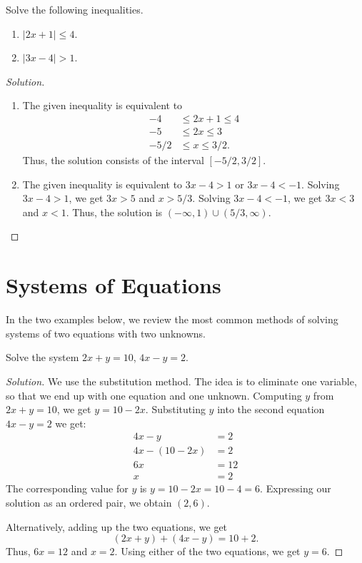 \documentclass{ximera}
\begin{document}
\begin{example}
Solve the following inequalities.
\begin{enumerate}
	\item $|2x+1| \leq 4$.
	\item $|3x-4| > 1$.
\end{enumerate}
\end{example}
\begin{proof}[Solution]
\begin{enumerate}
	\item{The given inequality is equivalent to
		\begin{align*}
			-4 &\leq 2x+1 \leq 4\\
			-5 &\leq 2x \leq 3\\
			-5/2 &\leq x \leq 3/2.
		\end{align*}
		Thus, the solution consists of the interval $[-5/2, 3/2]$.
	}
	\item{
		The given inequality is equivalent to $3x-4>1$ or $3x-4 < -1$.  Solving $3x-4 > 1$, we get $3x>5$ and $x > 5/3$.  Solving $3x-4 < -1$, we get $3x < 3$ and $x < 1$.
		Thus, the solution is $(-\infty, 1) \cup (5/3, \infty)$.
	}
\end{enumerate}
\end{proof}

\section{Systems of Equations}
In the two examples below, we review the most common methods of solving systems of two equations with two unknowns.

\begin{example}
	Solve the system $2x+y = 10$, $4x-y = 2$.
\end{example}
\begin{proof}[Solution]
We use the substitution method.  The idea is to eliminate one variable, so that we end up with one equation and one unknown.  Computing $y$ from $2x+y = 10$, we get
$y = 10-2x$.  Substituting $y$ into the second equation $4x-y=2$ we get:
\begin{align*}
	4x - y &= 2\\
	4x - (10 - 2x) &= 2\\
	6x &= 12\\
	x &= 2
\end{align*}
The corresponding value for $y$ is $y = 10 - 2x = 10 - 4 = 6$.   Expressing our solution as an ordered pair, we obtain $(2, 6)$.

Alternatively, adding up the two equations, we get
\[ (2x+y) + (4x - y) = 10 + 2. \]
Thus, $6x = 12$ and $x = 2$.  Using either of the two equations, we get $y = 6$.
\end{proof}
\end{document}
